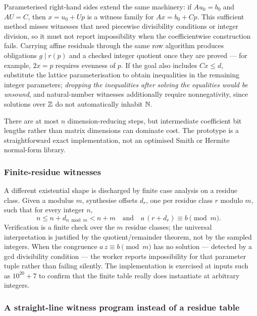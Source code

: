Parameterised right-hand sides extend the same machinery: if $Au_0=b_0$ and
$AU=C$, then $x=u_0+Up$ is a witness family for $Ax=b_0+Cp$. This sufficient
method misses witnesses that need piecewise divisibility conditions or integer
division, so it must not report impossibility when the coefficientwise
construction fails. Carrying affine residuals through the same row algorithm
produces obligations $g\mid r(p)$ and a checked integer quotient once they are
proved --- for example, $2x=p$ requires evenness of $p$. If the goal also
includes $Cx\le d$, substitute the lattice parameterisation to obtain
inequalities in the remaining integer parameters; \emph{dropping the
inequalities after solving the equalities would be unsound}, and
natural-number witnesses additionally require nonnegativity, since solutions
over $\mathbb{Z}$ do not automatically inhabit $\mathbb{N}$.

There are at most $n$ dimension-reducing steps, but intermediate coefficient
bit lengths rather than matrix dimensions can dominate cost. The prototype is a
straightforward exact implementation, not an optimised Smith or Hermite
normal-form library.

\subsubsection*{Finite-residue witnesses}

A different existential shape is discharged by finite case analysis on a residue
class. Given a modulus $m$, synthesise offsets $d_r$, one per residue class
$r$ modulo $m$, such that for every integer $n$,
\[
 n\le n+d_{n\bmod m}<n+m
 \quad\text{and}\quad
 a\,(r+d_r)\equiv b \pmod m .
\]
Verification is a finite check over the $m$ residue classes; the universal
interpretation is justified by the quotient/remainder theorem, not by the
sampled integers. When the congruence $a\,z\equiv b\pmod m$ has no solution ---
detected by a gcd divisibility condition --- the worker reports impossibility for
that parameter tuple rather than failing silently. The implementation is
exercised at inputs such as $10^{20}+7$ to confirm that the finite table really
does instantiate at arbitrary integers.

\subsubsection*{A straight-line witness program instead of a residue table}

